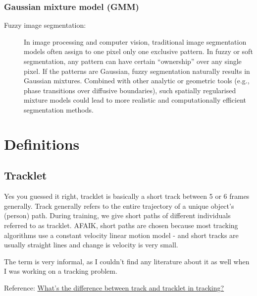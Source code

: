 \documentclass[a4paper,11pt]{article}
\begin{document}
\subsubsection{Gaussian mixture model (GMM)}
\begin{description}
    \item[Fuzzy image segmentation:] In image processing and computer vision, traditional image segmentation models often assign to one pixel only one exclusive pattern. In fuzzy or soft segmentation, any pattern can have certain ``ownership'' over any single pixel. If the patterns are Gaussian, fuzzy segmentation naturally results in Gaussian mixtures. Combined with other analytic or geometric tools (e.g., phase transitions over diffusive boundaries), such spatially regularised mixture models could lead to more realistic and computationally efficient segmentation methods.
\end{description}

\section{Definitions}
\subsection{Tracklet}
\label{def:tracklet}
Yes you guessed it right, tracklet is basically a short track between 5 or 6 frames generally. Track generally refers to the entire trajectory of a unique object's (person) path. During training, we give short paths of different individuals referred to as tracklet. AFAIK, short paths are chosen because most tracking algorithms use a constant velocity linear motion model - and short tracks are usually straight lines and change is velocity is very small.

The term is very informal, as I couldn't find any literature about it as well when I was working on a tracking problem.

Reference: \href{https://stackoverflow.com/questions/55512548/whats-the-difference-between-track-and-tracklet-in-tracking}{What's the difference between track and tracklet in tracking?}



\printbibliography
\end{document}

